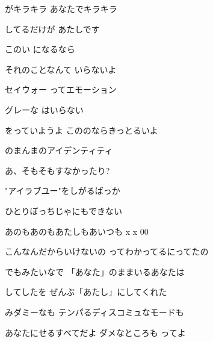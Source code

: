 \documentclass[a4paper,tate,twocolumn,12pt]{ltjtarticle}
\begin{document}
\begin{flushleft}
\vspace{2em}

\noindent\begin{minipage}{\linewidth}
がキラキラ あなたでキラキラ

してるだけが あたしです

このい になるなら

それのことなんて いらないよ
\end{minipage}

\vspace{2em}

\noindent\begin{minipage}{\linewidth}
セイウォー ってエモーション

グレーな はいらない

をっていようよ こののならきっとるいよ
\end{minipage}

\vspace{2em}

\noindent\begin{minipage}{\linewidth}
のまんまのアイデンティティ

あ、そもそもすなかったり?

"アイラブユー"をしがるばっか

ひとりぼっちじゃにもできない

あのもあのもあたしもあいつも x x 00

こんなんだからいけないの ってわかってるにってたの
\end{minipage}

\vspace{2em}

\noindent\begin{minipage}{\linewidth}
でもみたいなで 「あなた」のままいるあなたは

してしたを ぜんぶ「あたし」にしてくれた

みダミーなも テンパるディスコミュなモードも

あなたにせるすべてだよ ダメなところも ってよ
\end{minipage}


\end{flushleft}
\end{document}
